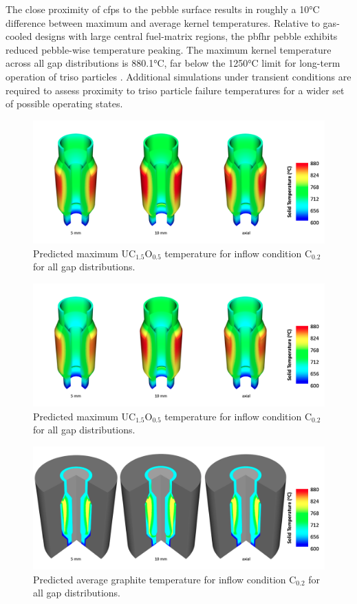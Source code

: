 The close proximity of \glspl{cfp} to the pebble surface results in roughly a 10\si{\celsius} difference between maximum and average kernel temperatures. Relative to gas-cooled designs with large central fuel-matrix regions, the \gls{pbfhr} pebble exhibits reduced pebble-wise temperature peaking. The maximum kernel temperature across all gap distributions is 880.1\si{\celsius}, far below the 1250\si{\celsius} limit for long-term operation of \gls{triso} particles \cite{nabielek,demkowicz}. Additional simulations under transient conditions are required to assess proximity to \gls{triso} particle failure temperatures for a wider set of possible operating states. 

\begin{figure}[h!]
\centering
\includegraphics[height=0.4\linewidth]{figs/max_uo2.png}
\caption{Predicted maximum UC$_{1.5}$O$_{0.5}$ temperature for inflow condition C$_\text{0.2}$ for all gap distributions.}
\label{fig:uo2_max}
\end{figure}

\begin{figure}[h!]
\centering
\includegraphics[height=0.4\linewidth]{figs/avg_uo2.png}
\caption{Predicted maximum UC$_{1.5}$O$_{0.5}$ temperature for inflow condition C$_\text{0.2}$ for all gap distributions.}
\label{fig:uo2_avg}
\end{figure}

\begin{figure}[h!]
\centering
\includegraphics[height=0.4\linewidth]{figs/graphite.png}
\caption{Predicted average graphite temperature for inflow condition C$_\text{0.2}$ for all gap distributions.}
\label{fig:graphite}
\end{figure}

